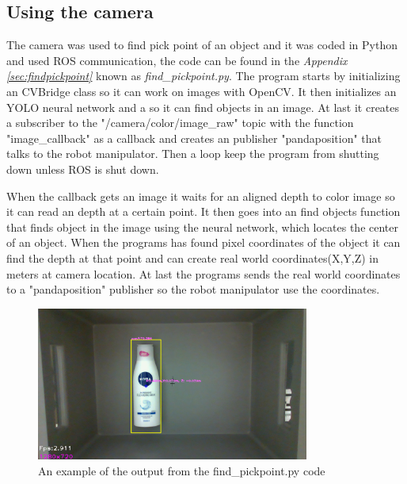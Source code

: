 

\subsection{Using the camera}\label{camera}
The camera was used to find pick point of an object and it was coded in Python and used ROS communication, the code can be found in the \textit{Appendix \ref{sec:findpickpoint}} known as \textit{find\_pickpoint.py}. 
The program starts by initializing an CVBridge class so it can work on images with OpenCV. It then initializes an YOLO neural network and a so it can find objects in an image. At last it creates a subscriber to the "/camera/color/image\_raw" topic with the function "image\_callback" as a callback and creates an publisher "pandaposition" that talks to the robot manipulator. Then a loop keep the program from shutting down unless ROS is shut down.

When the callback gets an image it waits for an aligned depth to color image so it can read an depth at a certain point. It then goes into an find objects function that finds object in the image using the neural network, which locates the center of an object. When the programs has found pixel coordinates of the object it can find the depth at that point and can create real world coordinates(X,Y,Z) in meters at camera location. At last the programs sends the real world coordinates to a "pandaposition" publisher so the robot manipulator use the coordinates.

\begin{figure}[h]
    \centering
    \includegraphics[width=0.8\textwidth]{graphics/findpickpoint.png}
    \caption{An example of the output from the find\_pickpoint.py code}
    \label{fig:findpickpoint}
\end{figure}

